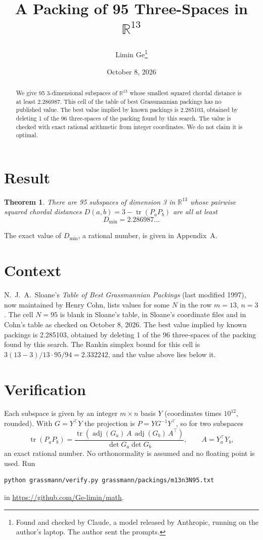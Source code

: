 \documentclass[11pt,a4paper]{article}
\title{A Packing of 95 Three-Spaces in $\mathbb{R}^{13}$}
\author{Limin Ge\thanks{Found and checked by Claude, a model released by Anthropic, running on the author's laptop. The author sent the prompts.}}
\date{October 8, 2026}
\newtheorem*{theorem}{Theorem}
\begin{document}
\maketitle
\begin{abstract}
We give 95 3-dimensional subspaces of $\mathbb{R}^{13}$ whose smallest squared chordal distance is at least 2.286987. This cell of the table of best Grassmannian packings has no published value. The best value implied by known packings is 2.285103, obtained by deleting 1 of the 96 three-spaces of the packing found by this search. The value is checked with exact rational arithmetic from integer coordinates. We do not claim it is optimal.
\end{abstract}

\section{Result}
\begin{theorem}
There are 95 subspaces of dimension 3 in $\mathbb{R}^{13}$ whose pairwise squared chordal distances $D(a,b) = 3 - \operatorname{tr}(P_aP_b)$ are all at least
\[ D_{\min} = 2.286987\ldots \]
\end{theorem}
The exact value of $D_{\min}$, a rational number, is given in Appendix~A.


\section{Context}
N.~J.~A.~Sloane's \emph{Table of Best Grassmannian Packings} (last modified 1997), now maintained by Henry Cohn, lists values for some $N$ in the row $m=13$, $n=3$. The cell $N=95$ is blank in Sloane's table, in Sloane's coordinate files and in Cohn's table as checked on October 8, 2026. The best value implied by known packings is 2.285103, obtained by deleting 1 of the 96 three-spaces of the packing found by this search. The Rankin simplex bound for this cell is $3(13-3)/13\cdot 95/94 = 2.332242$, and the value above lies below it.


\section{Verification}
Each subspace is given by an integer $m\times n$ basis $Y$ (coordinates times $10^{12}$, rounded). With $G=Y^\top Y$ the projection is $P=YG^{-1}Y^\top$, so for two subspaces
\[ \operatorname{tr}(P_aP_b)=\frac{\operatorname{tr}(\operatorname{adj}(G_a)\,A\,\operatorname{adj}(G_b)\,A^\top)}{\det G_a\det G_b},\qquad A=Y_a^\top Y_b, \]
an exact rational number. No orthonormality is assumed and no floating point is used. Run
\begin{verbatim}
python grassmann/verify.py grassmann/packings/m13n3N95.txt
\end{verbatim}
in \url{https://github.com/Ge-limin/math}.
\end{document}
